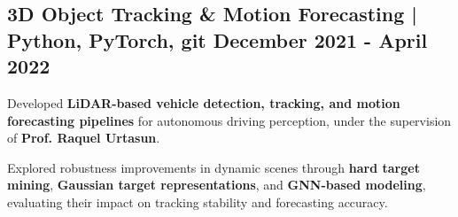 \subsection{{3D Object Tracking \& Motion Forecasting | Python, PyTorch, git  \hfill December 2021 - April 2022}}
\begin{zitemize}
    \item Developed \textbf{LiDAR-based vehicle detection, tracking, and motion forecasting pipelines} for autonomous driving perception, under the supervision of \textbf{Prof. Raquel Urtasun}.

    \item Explored robustness improvements in dynamic scenes through \textbf{hard target mining}, \textbf{Gaussian target representations}, and \textbf{GNN-based modeling}, evaluating their impact on tracking stability and forecasting accuracy.
\end{zitemize}




